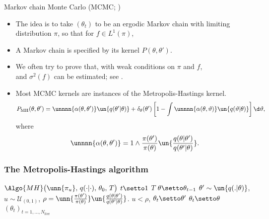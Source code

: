 \documentclass[10pt]{beamer}
\begin{document}
\begin{frame}{Markov chain Monte Carlo (MCMC; \citep{RoCa04})}
\begin{itemize}
  \item The idea is to take $(\theta_t)$ to be an ergodic Markov chain with limiting distribution $\pi$, so that for $f\in L^1(\pi)$,
  $$$$
  \vfill
  \item A Markov chain is specified by its kernel $P(\theta,\theta')$.
  \item We often try to prove that, with weak conditions on $\pi$ and $f$,
  $$$$
  \vfill
  and $\sigma^2(f)$ can be estimated; see \citep{DoMoSt14}.
  \item Most MCMC kernels are instances of the Metropolis-Hastings kernel.
  $$
  P_{\text{MH}}(\theta,\theta') = \unnnn{\alpha(\theta,\theta')} \un{q(\theta'\vert\theta)} + \delta_\theta(\theta')\left[1-\int \unnnn{\alpha(\theta,\vartheta)}\un{q(\vartheta\vert\theta)}\right]\d\vartheta,
  $$
  where
  $$
  \unnnn{\alpha(\theta,\theta')} = 1\wedge \frac{\pi(\theta')}{\pi(\theta)} \un{\frac{q(\theta\vert\theta')}{q(\theta'\vert\theta)}}.
  $$
  \end{itemize}
\end{frame}

\begin{frame}
\frametitle{The Metropolis-Hastings algorithm}
\begin{algorithm}{$\Algo{MH}\big(\unn{\pi_u},\, q(\cdot\vert\cdot),\,\theta_{0},\, T\big)$}
\Aitem \For $t\setto1$ \To $T$
\Aitem \mt $\theta\setto\theta_{t-1}$
\Aitem \mt $\theta'\sim \un{q(.\vert\theta)}$, $u\sim\mathcal U_{(0,1)}$,
\Aitem \mt $\rho =  \unn{\frac{\pi(\theta')}{\pi(\theta)}} \un{\frac{q(\theta\vert\theta')}{q(\theta'\vert\theta)}}$.
\Aitem \mt \If $u<\rho$,
\Aitem \mtt $\theta_{t}\setto\theta'$
\mt {}
\Aitem \mt \Else $\theta_{t}\setto\theta$
\mt {} \label{ai:acceptanceEnd}
\Aitem
\Return $(\theta_{t})_{t=1,\dots,N_{\text{iter}}}$
\end{algorithm}
\end{frame}
\end{document}
